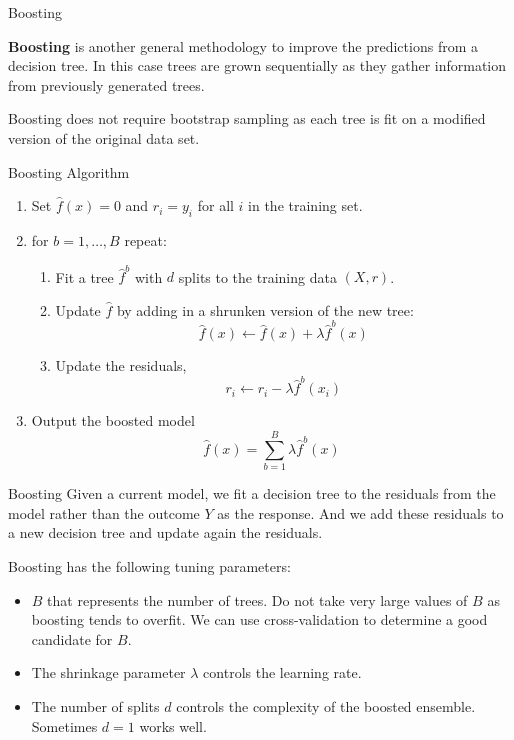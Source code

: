 \documentclass{beamer}
\begin{document}
	\begin{frame}{Boosting}
		
		{\bf Boosting} is another general methodology to improve the predictions from a decision tree. 
		In this case trees are grown sequentially as they gather information from previously generated trees. 
		
		Boosting does not require bootstrap sampling as each tree is fit on a modified version of the original data set.
		
		
		
	\end{frame}
	
	\begin{frame}{Boosting Algorithm}
		\begin{enumerate}
			\item Set $\hat{f}(x)=0$ and $r_i=y_i$ for all $i$ in the training set. 
			\item for $b=1,\ldots, B$ repeat:
			\begin{enumerate}
				\item Fit a tree $\hat{f}^b$ with $d$ splits to the training data $(X,r)$.
				\item Update $\hat{f}$ by adding in a shrunken version of the new tree:
				\begin{equation*}
					\hat{f}(x) \leftarrow \hat{f}(x)+ \lambda \hat{f}^b (x)
				\end{equation*}
				\item Update the residuals,
				\begin{equation*}
					r_i \leftarrow r_i - \lambda \hat{f}^b(x_i)
				\end{equation*}
			\end{enumerate}
			\item Output the boosted model
			\begin{equation}
				\hat{f}(x)=\sum_{b=1}^B \lambda \hat{f}^b(x)
			\end{equation}
		\end{enumerate}
	\end{frame}
	
	\begin{frame}{Boosting}
		Given a current model, we fit a decision tree to the residuals from the model rather than the outcome $Y$ as the response. And we add these residuals to a new decision tree and update again the residuals. 
		
		Boosting has the following tuning parameters:
		
		\begin{itemize}
			\item $B$ that represents the number of trees. Do not take very large values of $B$ as boosting tends to overfit. We can use cross-validation to determine a good candidate for $B$.
			\item The shrinkage parameter $\lambda$ controls the learning rate. 
			\item The number of splits $d$ controls the complexity of the boosted ensemble. Sometimes $d=1$ works well. 
	\end{itemize} \end{frame}
	
\end{document}
